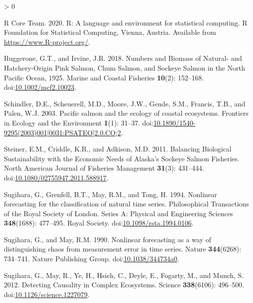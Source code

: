 \documentclass[
]{article}
\newlength{\cslhangindent}
\newenvironment{CSLReferences}[2] %
 {%
  \setlength{\parindent}{0pt}
  \ifodd #1 \everypar{\setlength{\hangindent}{\cslhangindent}}\ignorespaces\fi
  \ifnum #2 > 0
  \setlength{\parskip}{#2\baselineskip}
  \fi
 }%
 {}
\begin{document}
\begin{CSLReferences}{1}{0}
\leavevmode\hypertarget{ref-rcoreteam2020}{}%
R Core Team. 2020. R: A language and environment for statistical computing. R Foundation for Statistical Computing, Vienna, Austria. Available from \url{https://www.R-project.org/}.

\leavevmode\hypertarget{ref-ruggerone2018}{}%
Ruggerone, G.T., and Irvine, J.R. 2018. Numbers and {Biomass} of {Natural}- and {Hatchery}-{Origin Pink Salmon}, {Chum Salmon}, and {Sockeye Salmon} in the {North Pacific Ocean}, 1925{}. Marine and Coastal Fisheries \textbf{10}(2): 152--168. doi:\href{https://doi.org/10.1002/mcf2.10023}{10.1002/mcf2.10023}.

\leavevmode\hypertarget{ref-schindler2003}{}%
Schindler, D.E., Scheuerell, M.D., Moore, J.W., Gende, S.M., Francis, T.B., and Palen, W.J. 2003. Pacific salmon and the ecology of coastal ecosystems. Frontiers in Ecology and the Environment \textbf{1}(1): 31--37. doi:\href{https://doi.org/10.1890/1540-9295(2003)001\%5B0031:PSATEO\%5D2.0.CO;2}{10.1890/1540-9295(2003)001{[}0031:PSATEO{]}2.0.CO;2}.

\leavevmode\hypertarget{ref-steiner2011}{}%
Steiner, E.M., Criddle, K.R., and Adkison, M.D. 2011. Balancing {Biological Sustainability} with the {Economic Needs} of {Alaska}'s {Sockeye Salmon Fisheries}. North American Journal of Fisheries Management \textbf{31}(3): 431--444. doi:\href{https://doi.org/10.1080/02755947.2011.588917}{10.1080/02755947.2011.588917}.

\leavevmode\hypertarget{ref-sugihara1994}{}%
Sugihara, G., Grenfell, B.T., May, R.M., and Tong, H. 1994. Nonlinear forecasting for the classification of natural time series. Philosophical Transactions of the Royal Society of London. Series A: Physical and Engineering Sciences \textbf{348}(1688): 477--495. {Royal Society}. doi:\href{https://doi.org/10.1098/rsta.1994.0106}{10.1098/rsta.1994.0106}.

\leavevmode\hypertarget{ref-sugihara1990}{}%
Sugihara, G., and May, R.M. 1990. Nonlinear forecasting as a way of distinguishing chaos from measurement error in time series. Nature \textbf{344}(6268): 734--741. {Nature Publishing Group}. doi:\href{https://doi.org/10.1038/344734a0}{10.1038/344734a0}.

\leavevmode\hypertarget{ref-sugihara2012}{}%
Sugihara, G., May, R., Ye, H., Hsieh, C., Deyle, E., Fogarty, M., and Munch, S. 2012. Detecting {Causality} in {Complex Ecosystems}. Science \textbf{338}(6106): 496--500. doi:\href{https://doi.org/10.1126/science.1227079}{10.1126/science.1227079}.


\end{CSLReferences}
\end{document}
